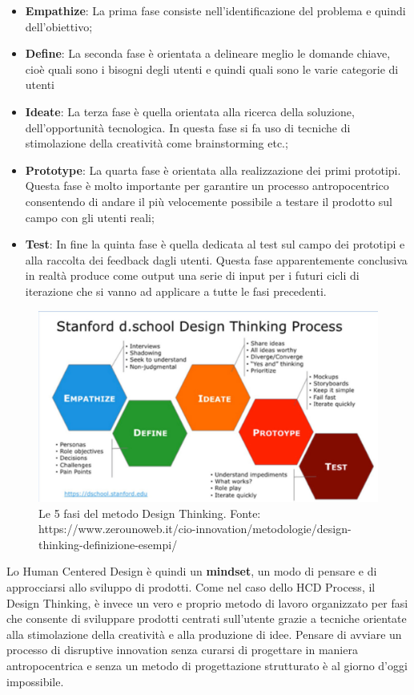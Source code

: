 \begin{itemize}
	\item \textbf{Empathize}: La prima fase consiste nell’identificazione del problema e quindi dell’obiettivo; 
	\item \textbf{Define}: La seconda fase è orientata a delineare meglio le domande chiave, cioè quali sono i bisogni degli utenti e quindi quali sono le varie categorie di utenti
	\item \textbf{Ideate}: La terza fase è quella orientata alla ricerca della soluzione, dell'opportunità tecnologica. In questa fase si fa uso di tecniche di stimolazione della creatività come brainstorming etc.;
	\item \textbf{Prototype}: La quarta fase è orientata alla realizzazione dei primi prototipi. Questa fase è molto importante per garantire un processo antropocentrico consentendo di andare il più velocemente possibile a testare il prodotto sul campo con gli utenti reali;
	\item \textbf{Test}: In fine la quinta fase è quella dedicata al test sul campo dei prototipi e alla raccolta dei feedback dagli utenti. Questa fase apparentemente conclusiva in realtà produce come output una serie di input per i futuri cicli di iterazione che si vanno ad applicare a tutte le fasi precedenti.
	
\end{itemize}

\begin{figure}
	\centering
	\includegraphics[width=\textwidth]{immagini/designthinking}
	\caption{Le 5 fasi del metodo Design Thinking. Fonte: https://www.zerounoweb.it/cio-innovation/metodologie/design-thinking-definizione-esempi/}
\end{figure}


Lo Human Centered Design è quindi un \textbf{mindset}, un modo di pensare e di approcciarsi allo sviluppo di prodotti. Come nel caso dello HCD Process, il Design Thinking, è invece un vero e proprio metodo di lavoro organizzato per fasi che consente di sviluppare prodotti centrati sull'utente grazie a tecniche orientate alla stimolazione della creatività e alla produzione di idee. Pensare di avviare un processo di disruptive innovation senza curarsi di progettare in maniera antropocentrica e senza un metodo di progettazione strutturato è al giorno d'oggi impossibile.

